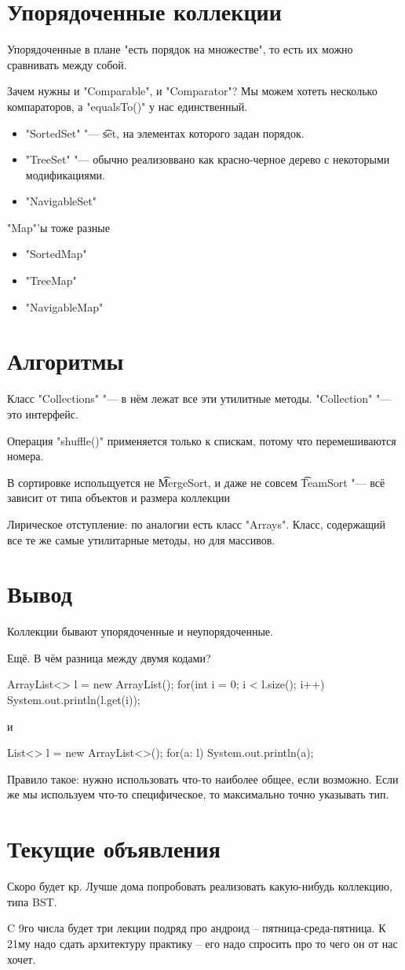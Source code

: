 \section{Упорядоченные коллекции}
Упорядоченные в плане "есть порядок на множестве", то есть их можно сравнивать между собой.

Зачем нужны и \java"Comparable", и \java"Comparator"? Мы можем хотеть несколько компараторов, а \java"equalsTo()" у нас единственный.
\begin{itemize}
	\item
		\java"SortedSet" "--- \t{set}, на элементах которого задан порядок.
	\item
		\java"TreeSet" "--- обычно реализоввано как красно-черное дерево с некоторыми модификациями.
	\item
		\java"NavigableSet"
\end{itemize}

\java"Map"'ы тоже разные
\begin{itemize}
	\item
		\java"SortedMap"
	\item
		\java"TreeMap"
	\item 
		\java"NavigableMap"
\end{itemize}

\section{Алгоритмы}
Класс \java"Collections" "--- в нём лежат все эти утилитные методы.
\java"Collection" "--- это интерфейс.

Операция \java"shuffle()" применяется только к спискам, потому что перемешиваются номера.

В сортировке испольщуется не \t{MergeSort}, и даже не совсем \t{TeamSort} "--- всё зависит от типа объектов и размера коллекции

Лирическое отступление: по аналогии есть класс \java"Arrays". Класс, содержащий все те же самые утилитарные методы, но для массивов.

\section{Вывод}
Коллекции бывают упорядоченные и неупорядоченные.

Ещё. В чём разница между двумя кодами?
\begin{javacode}
ArrayList<> l = new ArrayList();
for(int i = 0; i < l.size(); i++) {
	System.out.println(l.get(i));
}
\end{javacode}
и
\begin{javacode}
List<> l = new ArrayList<>();
for(a: l) {
	System.out.println(a);
}
\end{javacode}
Правило такое: нужно использовать что-то наиболее общее, если возможно. Если же мы используем что-то специфическое, 
то максимально точно указывать тип.

\section{Текущие объявления}
Скоро будет кр. Лучше дома попробовать реализовать какую-нибудь коллекцию, типа BST.

C 9го числа будет три лекции подряд про андроид -- пятница-среда-пятница.
К 21му надо сдать архитектуру практику -- его надо спросить про то чего он от нас хочет.
